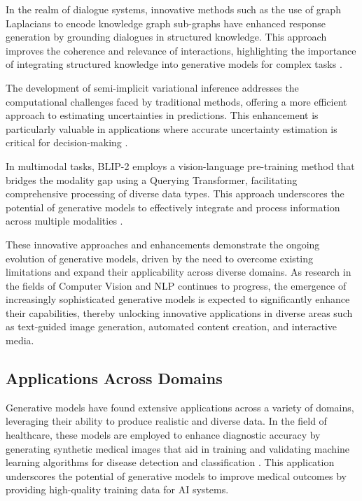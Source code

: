 In the realm of dialogue systems, innovative methods such as the use of graph Laplacians to encode knowledge graph sub-graphs have enhanced response generation by grounding dialogues in structured knowledge. This approach improves the coherence and relevance of interactions, highlighting the importance of integrating structured knowledge into generative models for complex tasks \cite{chaudhuri2021groundingdialoguesystemsknowledge}.



The development of semi-implicit variational inference addresses the computational challenges faced by traditional methods, offering a more efficient approach to estimating uncertainties in predictions. This enhancement is particularly valuable in applications where accurate uncertainty estimation is critical for decision-making \cite{moens2021efficientsemiimplicitvariationalinference}.



In multimodal tasks, BLIP-2 employs a vision-language pre-training method that bridges the modality gap using a Querying Transformer, facilitating comprehensive processing of diverse data types. This approach underscores the potential of generative models to effectively integrate and process information across multiple modalities \cite{li2023blip}.



These innovative approaches and enhancements demonstrate the ongoing evolution of generative models, driven by the need to overcome existing limitations and expand their applicability across diverse domains. As research in the fields of Computer Vision and NLP continues to progress, the emergence of increasingly sophisticated generative models is expected to significantly enhance their capabilities, thereby unlocking innovative applications in diverse areas such as text-guided image generation, automated content creation, and interactive media. \cite{palmini2024patternscreativityuserinput}



\subsection{Applications Across Domains} \label{subsec:Applications Across Domains}



Generative models have found extensive applications across a variety of domains, leveraging their ability to produce realistic and diverse data. In the field of healthcare, these models are employed to enhance diagnostic accuracy by generating synthetic medical images that aid in training and validating machine learning algorithms for disease detection and classification \cite{zolfaghari2023surveyautomateddetectionclassification}. This application underscores the potential of generative models to improve medical outcomes by providing high-quality training data for AI systems.



